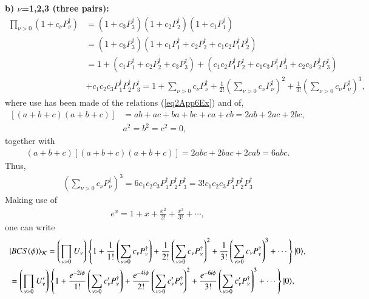 \begin{subappendices}
\textbf{b) $\nu$=1,2,3 (three pairs):}
\begin{align}\label{eq2App7Ex}
\nonumber \prod_{\nu>0}\left(1+c_\nu P_\nu^\dagger\right)&=\left(1+c_3P_3^\dagger\right)\left(1+c_2P_2^\dagger\right)\left(1+c_1P_1^\dagger\right)\\
\nonumber &=\left(1+c_3P_3^\dagger\right)\left(1+c_1P_1^\dagger+c_2P_2^\dagger+c_1c_2P_1^\dagger P_2^\dagger\right)\\
\nonumber&=1+\left(c_1P_1^\dagger+c_2P_2^\dagger+c_3P_3^\dagger\right)+\left(c_1c_2P_1^\dagger P_2^\dagger+c_1c_3P_1^\dagger P_3^\dagger+c_2c_3P_2^\dagger P_3^\dagger\right)\\
&+c_1c_2c_3P_1^\dagger P_2^\dagger P_3^\dagger=1+\sum_{\nu>0}c_\nu P_\nu^\dagger + \frac{1}{2!}\left(\sum_{\nu>0}c_\nu P^\dagger_\nu\right)^2+\frac{1}{3!}\left(\sum_{\nu>0}c_\nu P^\dagger_\nu\right)^3,
\end{align}
where use has been made of the relations (\ref{eq2App6Ex}) and of,
\begin{align}
\nonumber \left[\left(a+b+c\right)\left(a+b+c\right)\right]&=ab+ac+ba +bc+ca+cb=2ab+2ac+2bc,\\
\nonumber & a^2=b^2=c^2=0,
\end{align}
together with
\begin{align}\label{eq2App9Ex}
 (a+b+c)\left[\left(a+b+c\right)\left(a+b+c\right)\right]=2abc+2bac+2cab=6abc.
\end{align}
Thus,
\begin{align}\label{eq2App10Ex}
\left(\sum_{\nu>0}c_\nu P_\nu^\dagger\right)^3=6c_1c_2c_3P_1^\dagger P_2^\dagger P_3^\dagger=3!c_1c_2c_3P_1^\dagger P_2^\dagger P_3^\dagger
\end{align}
Making use of
\begin{align}\label{eq2App11Ex}
e^x=1+x+\frac{x^2}{2!}+\frac{x^3}{3!}+\cdots,
\end{align}
one can write
\begin{align}\label{eq1App11Ex} 
\nonumber &\ket{BCS(\phi)}_{\mathcal K}=\left(\prod_{\nu>0}U_\nu\right)\left\{1+\frac{1}{1!}\left(\sum_{\nu>0}c_\nu P_\nu^\dagger\right)+\frac{1}{2!}\left(\sum_{\nu>0}c_\nu P_\nu^\dagger\right)^2+\frac{1}{3!}\left(\sum_{\nu>0}c_\nu P_\nu^\dagger\right)^3+\cdots\right\}\ket{0},\\
&=\left(\prod_{\nu>0}U'_\nu\right)\left\{1+\frac{e^{-2i\phi}}{1!}\left(\sum_{\nu>0}c'_\nu P_\nu^\dagger\right)+\frac{e^{-4i\phi}}{2!}\left(\sum_{\nu>0}c'_\nu P_\nu^\dagger\right)^2+\frac{e^{-6i\phi}}{3!}\left(\sum_{\nu>0}c'_\nu P_\nu^\dagger\right)^3+\cdots\right\}\ket{0},

\end{align}
\end{subappendices}

